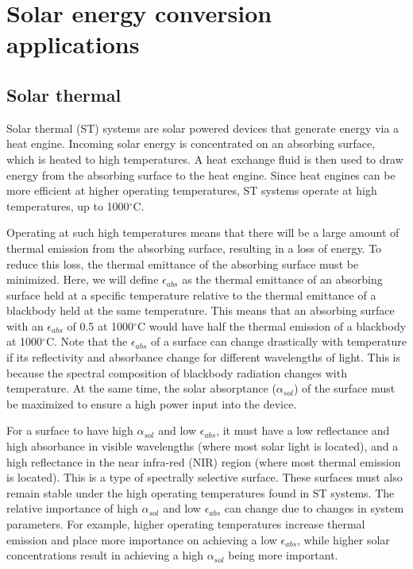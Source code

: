 \documentclass[review]{elsarticle}
\begin{document}
\section{Solar energy conversion applications}
\subsection{Solar thermal}
Solar thermal (ST) systems are solar powered devices that generate energy via a heat engine.  Incoming solar energy is concentrated on an absorbing surface, which is heated to high temperatures.  A heat exchange fluid is then used to draw energy from the absorbing surface to the heat engine.  Since heat engines can be more efficient at higher operating temperatures, ST systems operate at high temperatures, up to 1000$^\circ$C.

Operating at such high temperatures means that there will be a large amount of thermal emission from the absorbing surface, resulting in a loss of energy.  To reduce this loss, the thermal emittance of the absorbing surface must be minimized.  Here, we will define $\epsilon_{abs}$ as the thermal emittance of an absorbing surface held at a specific temperature relative to the thermal emittance of a blackbody held at the same temperature.  This means that an absorbing surface with an $\epsilon_{abs}$ of 0.5 at 1000$^\circ$C would have half the thermal emission of a blackbody at 1000$^\circ$C.  Note that the $\epsilon_{abs}$ of a surface can change drastically with temperature if its reflectivity and absorbance change for different wavelengths of light.  This is because the spectral composition of blackbody radiation changes with temperature.  At the same time, the solar absorptance ($\alpha_{sol}$) of the surface must be maximized to ensure a high power input into the device.

For a surface to have high $\alpha_{sol}$ and low $\epsilon_{abs}$, it must have a low reflectance and high absorbance in visible wavelengths (where most solar light is located), and a high reflectance in the near infra-red (NIR) region (where most thermal emission is located).  This is a type of spectrally selective surface.  These surfaces must also remain stable under the high operating temperatures found in ST systems.  The relative importance of high $\alpha_{sol}$ and low $\epsilon_{abs}$ can change due to changes in system parameters.  For example, higher operating temperatures increase thermal emission and place more importance on achieving a low $\epsilon_{abs}$, while higher solar concentrations result in achieving a high $\alpha_{sol}$ being more important.
\end{document}
